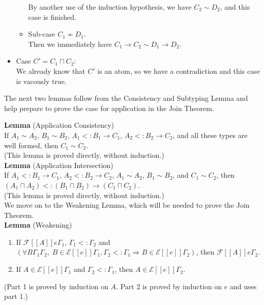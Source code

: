 \documentclass{article}
\newcommand{\SEM}[1]{[\![ #1 ]\!]}
\newcommand{\ESEM}[1]{\mathcal{E}\SEM{#1}}
\newcommand{\FSEM}[1]{\mathcal{F}\SEM{#1}}
\begin{document}
\begin{itemize}
\begin{itemize}
    By another use of the induction hypothesis, we have
    $C_2 \sim D_2$, and this case is finished.
    
  \item Sub-case $C_1 \not\sim D_1$.\\
    Then we immediately have $C_1 \to C_2 \sim D_1 \to D_2$.
  \end{itemize}
  
\item Case $C'=C_1\sqcap C_2$:\\
  We already know that $C'$ is an atom, so we have a contradiction
  and this case is vacously true.
\end{itemize}

The next two lemmas follow from the Consistency and Subtyping Lemma
and help prepare to prove the case for application in the Join
Theorem.

\noindent \textbf{Lemma} (Application Consistency) \\
%
If $A_1 \sim A_2$, $B_1 \sim B_2$, $A_1 <: B_1 \to C_1$,
$A_2 <: B_2 \to C_2$, and all these types are well formed,
then $C_1 \sim C_2$.\\
(This lemma is proved directly, without induction.)\\

\noindent \textbf{Lemma} (Application Intersection) \\
%
If $A_1 <: B_1 \to C_1$, $A_2 <: B_2 \to C_2$, $A_1 \sim A_2$,
$B_1 \sim B_2$, and $C_1 \sim C_2$, then
$(A_1\sqcap A_2) <: (B_1 \sqcap B_2) \to (C_1 \sqcap C_2)$.\\
(This lemma is proved directly, without induction.) \\

We move on to the Weakening Lemma, which will be needed to prove the
Join Theorem. \\

\noindent \textbf{Lemma} (Weakening)
\begin{enumerate}
\item If $\FSEM{A}e \Gamma_1$, $\Gamma_1 <: \Gamma_2$ and
  $(\forall B \Gamma_1 \Gamma_2,\; B \in \ESEM{e}\Gamma_1, \Gamma_2 <: \Gamma_1
  \Rightarrow B \in \ESEM{e}\Gamma_2)$, then
  $\FSEM{A}e \Gamma_2$.
\item If $A \in \ESEM{e}\Gamma_1$ and $\Gamma_2 <: \Gamma_1$,
  then $A \in \ESEM{e}\Gamma_2$.
\end{enumerate}
(Part 1 is proved by induction on $A$. Part 2 is proved by induction
on $e$ and uses part 1.) \\
\end{document}
